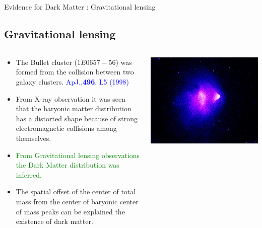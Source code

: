 \documentclass[11pt]{beamer}
\begin{document}
\begin{frame}{Evidence for Dark Matter : Gravitational lensing}

\subsection{Gravitational lensing}

\vspace{-0.3cm}

\begin{columns}
\begin{column}{0.6\textwidth}
\begin{small}
\begin{itemize}
\item The Bullet cluster ($1E0657-56$) was formed from  the collision between two galaxy clusters.  \textcolor{blue}{\tiny{ApJ.,{\bf 496}, L5 (1998)}}
\item From X-ray observation it was seen that the baryonic matter distribution has a distorted shape because of strong electromagnetic collisions among themselves. 
\item  \textcolor{green}{From Gravitational lensing observations the Dark Matter distribution was inferred.}

\item The spatial offset of the center of total mass from the center of baryonic center of mass peaks can be explained the existence of dark matter.

 

\end{itemize}
 \end{small}
\end{column}

\begin{column}{0.5\textwidth}
\includegraphics[scale=0.2]{bclstr.jpg}
\end{column}


\end{columns}
\end{frame}
\end{document}
